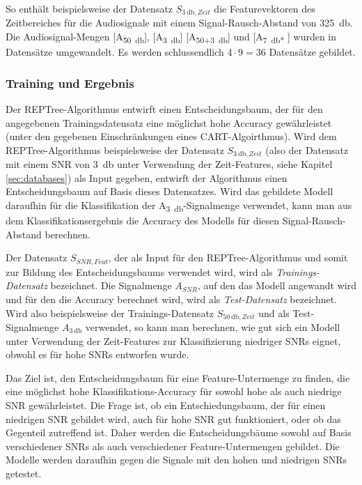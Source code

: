 So enthält beispielsweise der Datensatz $S_{\SI{3}{\decibel},Zeit}$
die Featurevektoren des Zeitbereiches für die Audiosignale mit einem Signal-Rausch-Abstand von 3\SI{25}{\decibel}. Die Audiosignal-Mengen [A\textsubscript{\SI{50}{\decibel}}], [A\textsubscript{\SI{3}{\decibel}}] [A\textsubscript{50+\SI{3}{\decibel}}] und [A\textsubscript{\SI{7}{\decibel}* }] wurden in Datensätze umgewandelt. Es werden schlussendlich $4 \cdot 9 = 36$ Datensätze gebildet.

\subsubsection{Training und Ergebnis} 
\label{sec:results}

Der REPTree-Algorithmus entwirft einen Entscheidungsbaum, der für den angegebenen Trainingsdatensatz eine möglichst hohe Accuracy gewährleistet (unter den gegebenen Einschränkungen eines CART-Algoirthmus). Wird dem REPTree-Algorithmus beispielsweise der Datensatz $S_{\SI{3}{\decibel},Zeit}$ (also der Datensatz mit einem SNR von \SI{3}{\decibel} unter Verwendung der Zeit-Features, siehe Kapitel \ref{sec:databases}) als Input gegeben, entwirft der Algorithmus einen Entscheidungsbaum auf Basis dieses Datensatzes. Wird das gebildete Modell daraufhin für die Klassifikation der A\textsubscript{\SI{3}{\decibel}}-Signalmenge verwendet, kann man aus dem Klassifikationsergebnis die Accuracy des Modells für diesen Signal-Rausch-Abstand berechnen. 

Der Datensatz $S_{SNR,Feat}$, der als Input für den REPTree-Algorithmus und somit zur Bildung des Entscheidungsbaums verwendet wird, wird als \emph{Trainings-Datensatz} bezeichnet. Die Signalmenge $A_{SNR}$, auf den das Modell angewandt wird und für den die Accuracy berechnet wird, wird als \emph{Test-Datensatz} bezeichnet. Wird also beispielsweise der Trainings-Datensatz $S_{\SI{50}{\decibel},Zeit}$ und als Test-Signalmenge $A_{\SI{3}{\decibel}}$ verwendet, so kann man berechnen, wie gut sich ein Modell unter Verwendung der Zeit-Features zur Klassifizierung niedriger SNRs eignet, obwohl es für hohe SNRs entworfen wurde.

Das Ziel ist, den Entscheidungsbaum für eine Feature-Untermenge zu finden, die eine möglichst hohe Klassifikations-Accuracy für sowohl hohe als auch niedrige SNR gewährleistet. Die Frage ist, ob ein Entschiedungsbaum, der für einen niedrigen SNR gebildet wird, auch für hohe SNR gut funktioniert, oder ob das Gegenteil zutreffend ist. Daher werden die Entscheidungsbäume sowohl auf Basis verschiedener SNRs als auch verschiedener Feature-Untermengen gebildet. Die Modelle werden daraufhin gegen die Signale mit den hohen und niedrigen SNRs getestet.

